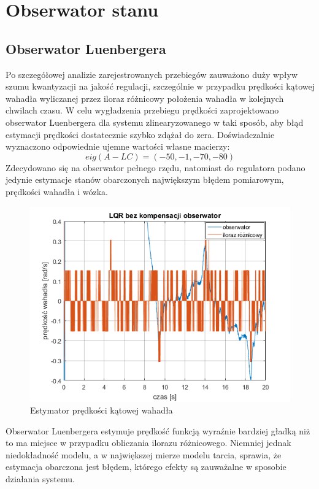 \section{Obserwator stanu}
\subsection{Obserwator Luenbergera}
Po szczegółowej analizie zarejestrowanych przebiegów zauważono duży wpływ szumu kwantyzacji na jakość regulacji, szczególnie w przypadku prędkości kątowej wahadła wyliczanej przez iloraz różnicowy położenia wahadła w kolejnych chwilach czasu. W celu wygładzenia przebiegu prędkości zaprojektowano obserwator Luenbergera dla systemu zlinearyzowanego w taki sposób, aby błąd estymacji prędkości dostatecznie szybko zdążał do zera. Doświadczalnie wyznaczono odpowiednie ujemne wartości własne macierzy:
\begin{equation}  
eig(A-LC) = (-50,-1,-70,-80)
\end{equation} 
Zdecydowano się na obserwator pełnego rzędu, natomiast do regulatora podano jedynie estymacje stanów obarczonych największym błędem pomiarowym, prędkości wahadła i wózka.
\begin{figure}[H]
\centering
\includegraphics[width=14cm]{obrazy/pendulum/observ.png}
\caption{Estymator prędkości kątowej wahadła}
\label{fig:observ}
\end{figure}
Obserwator Luenbergera estymuje prędkość funkcją wyraźnie bardziej gładką niż to ma miejsce w przypadku obliczania ilorazu różnicowego. Niemniej jednak niedokładność modelu, a w największej mierze modelu tarcia, sprawia, że estymacja obarczona jest błędem, którego efekty są zauważalne w sposobie działania systemu.

